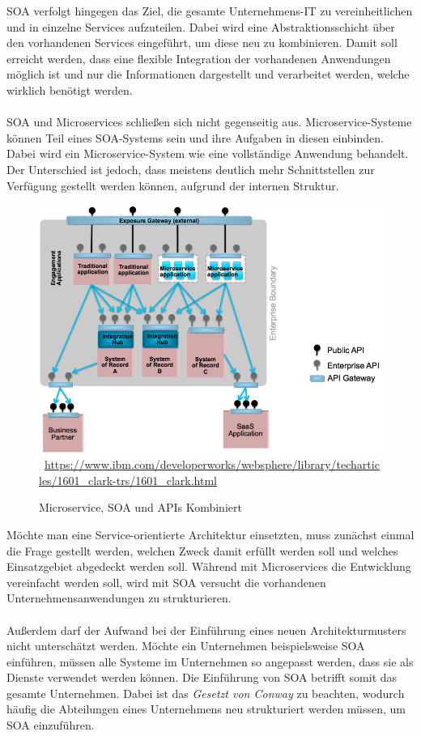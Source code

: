 SOA verfolgt hingegen das Ziel, die gesamte Unternehmens-IT zu vereinheitlichen und in einzelne Services aufzuteilen. Dabei wird eine Abstraktionsschicht über den vorhandenen Services eingeführt, um diese neu zu kombinieren. Damit soll erreicht werden, dass eine flexible Integration der vorhandenen Anwendungen möglich ist und nur die Informationen dargestellt und verarbeitet werden, welche wirklich benötigt werden.
\\\\
SOA und Microservices schließen sich nicht gegenseitig aus. Microservice-Systeme können Teil eines SOA-Systems sein und ihre Aufgaben in diesen einbinden. Dabei wird ein Microservice-System wie eine vollständige Anwendung behandelt. Der  Unterschied ist jedoch, dass meistens deutlich mehr Schnittstellen zur Verfügung gestellt werden können, aufgrund der internen Struktur.
\begin{figure}[htb]
    \centering 
    \includegraphics[width=\textwidth]{content/images/figure8}\
    \quelle\url{https://www.ibm.com/developerworks/websphere/library/techarticles/1601_clark-trs/1601_clark.html}
    \caption{Microservice, SOA und APIs Kombiniert}
    \label{fig:MicroservicesSOAAndAPIsCombined} 
\end{figure}

Möchte man eine Service-orientierte Architektur einsetzten, muss zunächst einmal die Frage gestellt werden, welchen Zweck damit erfüllt werden soll und welches Einsatzgebiet abgedeckt werden soll. Während mit Microservices die Entwicklung vereinfacht werden soll, wird mit SOA versucht die vorhandenen Unternehmensanwendungen zu strukturieren.
\\\\
Außerdem darf der Aufwand bei der Einführung eines neuen Architekturmusters nicht unterschätzt werden. Möchte ein Unternehmen beispielsweise SOA einführen, müssen alle Systeme im Unternehmen so angepasst werden, dass sie als Dienste verwendet werden können. Die Einführung von SOA betrifft somit das gesamte Unternehmen. Dabei ist das \textit{Gesetzt von Conway} zu beachten, wodurch häufig die Abteilungen eines Unternehmens neu strukturiert werden müssen, um SOA einzuführen. 

